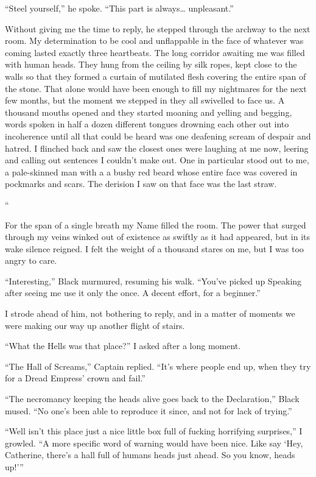 \documentclass[12pt, openany]{book}
\begin{document}
“Steel yourself,” he spoke. “This part is always… unpleasant.”

Without giving me the time to reply, he stepped through the archway to the next room. My determination to be cool and unflappable in the face of whatever was coming lasted exactly three heartbeats. The long corridor awaiting me was filled with human heads. They hung from the ceiling by silk ropes, kept close to the walls so that they formed a curtain of mutilated flesh covering the entire span of the stone. That alone would have been enough to fill my nightmares for the next few months, but the moment we stepped in they all swivelled to face us. A thousand mouths opened and they started moaning and yelling and begging, words spoken in half a dozen different tongues drowning each other out into incoherence until all that could be heard was one deafening scream of despair and hatred. I flinched back and saw the closest ones were laughing at me now, leering and calling out sentences I couldn’t make out. One in particular stood out to me, a pale-skinned man with a a bushy red beard whose entire face was covered in pockmarks and scars. The derision I saw on that face was the last straw.

“

For the span of a single breath my Name filled the room. The power that surged through my veins winked out of existence as swiftly as it had appeared, but in its wake silence reigned. I felt the weight of a thousand stares on me, but I was too angry to care.

“Interesting,” Black murmured, resuming his walk. “You’ve picked up Speaking after seeing me use it only the once. A decent effort, for a beginner.”

I strode ahead of him, not bothering to reply, and in a matter of moments we were making our way up another flight of stairs.

“What the Hells was that place?” I asked after a long moment.

“The Hall of Screams,” Captain replied. “It’s where people end up, when they try for a Dread Empress’ crown and fail.”

“The necromancy keeping the heads alive goes back to the Declaration,” Black mused. “No one’s been able to reproduce it since, and not for lack of trying.”

“Well isn’t this place just a nice little box full of fucking horrifying surprises,” I growled. “A more specific word of warning would have been nice. Like say ‘Hey, Catherine, there’s a hall full of humans heads just ahead. So you know, heads up!’”
\end{document}
